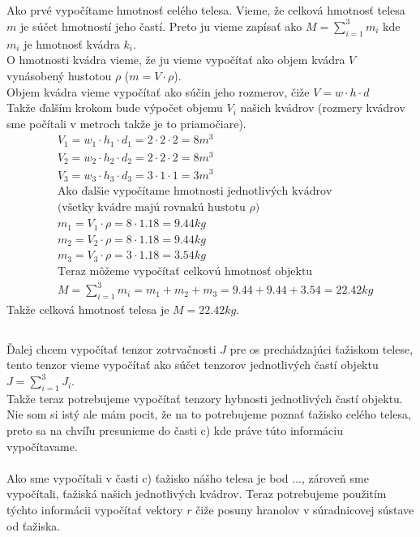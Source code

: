 \documentclass[a4paper]{article}
\begin{document}
	\subsection{}
	
	Ako prvé vypočítame hmotnosť celého telesa. Vieme, že celková hmotnosť telesa $m$ je súčet hmotností jeho častí. Preto ju vieme zapísať ako $M=\sum_{i=1}^{3}m_i$ kde $m_i$ je hmotnosť kvádra $k_i$.
	\\
	O hmotnosti kvádra vieme, že ju vieme vypočítať ako objem kvádra $V$ vynásobený hustotou $\rho$ ($m = V \cdot \rho$). 
	\\
	Objem kvádra vieme vypočítať ako súčin jeho rozmerov, čiže $V=w \cdot h \cdot d$
	\\
	Takže ďalším krokom bude výpočet objemu $V_i$ našich kvádrov (rozmery kvádrov sme počítali v metroch takže je to priamočiare). 
	\begin{align*}
		&V_1 = w_1 \cdot h_1 \cdot d_1 = 2 \cdot 2 \cdot 2 = 8 m^3 
		\\
		&V_2 = w_2 \cdot h_2 \cdot d_2 = 2 \cdot 2 \cdot 2 = 8 m^3 
		\\
		&V_3 = w_3 \cdot h_3 \cdot d_3 = 3 \cdot 1 \cdot 1 = 3 m^3
		\\
		&\text{Ako ďalšie vypočítame hmotnosti jednotlivých kvádrov}
		\\
		&\text{(všetky kvádre majú rovnakú hustotu $\rho$)} 
		\\
		&m_1 = V_1 \cdot \rho = 8 \cdot 1.18 = 9.44 kg
		\\
		&m_2 = V_2 \cdot \rho = 8 \cdot 1.18 = 9.44 kg
		\\
		&m_3 = V_3 \cdot \rho = 3 \cdot 1.18 = 3.54 kg
		\\
		&\text{Teraz môžeme vypočítať celkovú hmotnosť objektu}
		\\
		&M = \sum_{i=1}^{3} m_i = m_1 + m_2 + m_3 = 9.44 + 9.44 + 3.54 = 22.42 kg
	\end{align*}  
	Takže celková hmotnosť telesa je $M = 22.42 kg$.
	
	\subsection{}
	
	Ďalej chcem vypočítať tenzor zotrvačnosti $J$ pre os prechádzajúci ťažiskom telese, tento tenzor vieme vypočítať ako súčet tenzorov jednotlivých častí objektu $J = \sum_{i=1}^{3} J_i$.
	\\
	Takže teraz potrebujeme vypočítať tenzory hybnosti jednotlivých častí objektu. Nie som si istý ale mám pocit, že na to potrebujeme poznať ťažisko celého telesa, preto sa na chvíľu presunieme do časti c) kde práve túto informáciu vypočítavame.
	\\
	\\
	Ako sme  vypočítali v časti c) ťažisko nášho telesa je bod $...$, zároveň sme vypočítali, ťažiská našich jednotlivých kvádrov. Teraz potrebujeme použitím týchto informácii vypočítať vektory $r$ čiže posuny hranolov v súradnicovej sústave od ťažiska.
	
\end{document}
